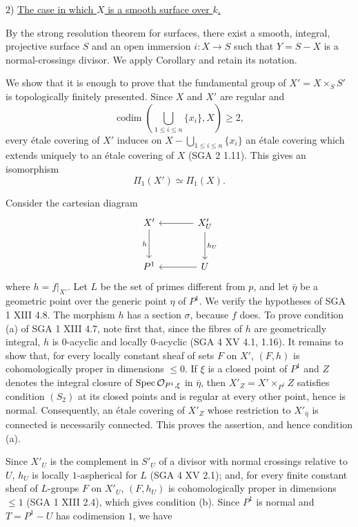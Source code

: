 2) \underline{The case in which $X$ is a smooth surface over $k$.}

By the strong resolution theorem for surfaces, there exist a smooth,
integral, projective surface $S$ and an open immersion
$i:X\longrightarrow S$ such that $Y=S-X$ is a normal-crossings divisor.
We apply Corollary  and retain its notation.


We show that it is enough to prove that the fundamental group of
$X'=X\times_S S'$ is topologically finitely presented. Since $X$ and
$X'$ are regular and
\[
 \operatorname{codim}\!\left(\bigcup_{1\leq i\leq n}\{x_i\},X\right)
 \geq 2,
\]
every \'etale covering of $X'$ induces on
$X-\bigcup_{1\leq i\leq n}\{x_i\}$ an \'etale covering which extends
uniquely to an \'etale covering of $X$ (SGA 2 1.11). This gives an
isomorphism
\[
 \Pi_1(X')\simeq\Pi_1(X).
\]

Consider the cartesian diagram
\[
\begin{tikzcd}[column sep=large,row sep=large]
X' \arrow[d,"h"'] & X'_U \arrow[l] \arrow[d,"h_U"] \\
P^1 & U \arrow[l]
\end{tikzcd}
\]
where $h=f|_{X'}$. Let $L$ be the set of primes different from $p$, and
let $\bar\eta$ be a geometric point over the generic point $\eta$ of
$P^1$. We verify the hypotheses of SGA 1 XIII 4.8. The morphism $h$ has
a section $\sigma$, because $f$ does. To prove condition (a) of
SGA 1 XIII 4.7, note first that, since the fibres of $h$ are
geometrically integral, $h$ is $0$-acyclic and locally $0$-acyclic
(SGA 4 XV 4.1, 1.16). It remains to show that, for every locally constant
sheaf of sets $F$ on $X'$, $(F,h)$ is cohomologically proper in
dimensions $\leq 0$. If $\xi$ is a closed point of $P^1$ and $Z$ denotes
the integral closure of $\operatorname{Spec}\mathcal O_{P^1,\xi}$ in $\bar\eta$, then
$X'_Z=X'\times_{P^1}Z$ satisfies condition $(S_2)$ at its closed points
and is regular at every other point, hence is normal. Consequently, an
\'etale covering of $X'_Z$ whose restriction to $X'_{\bar\eta}$ is
connected is necessarily connected. This proves the assertion, and
hence condition (a).

Since $X'_U$ is the complement in $S'_U$ of a divisor with normal
crossings relative to $U$, $h_U$ is locally $1$-aspherical for $L$
(SGA 4 XV 2.1); and, for every finite constant sheaf of $L$-groups $F$
on $X'_U$, $(F,h_U)$ is cohomologically proper in dimensions $\leq 1$
(SGA 1 XIII 2.4), which gives condition (b). Since $P^1$ is normal and
$T=P^1-U$ has codimension $1$, we have


